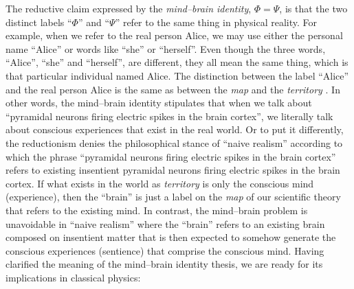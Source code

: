 \documentclass{ws-ijmpb}
\begin{document}
The reductive claim expressed by the \emph{mind--brain identity}, $\Phi=\Psi$,
is that the two distinct labels ``$\Phi$'' and ``$\Psi$''
refer to the same thing in physical reality. For example, when we
refer to the real person Alice, we may use either the personal name
``Alice'' or words like ``she'' or ``herself''.
Even though the three words, ``Alice'', ``she'' and
``herself'', are different, they all mean the same thing,
which is that particular individual named Alice. The distinction between
the label ``Alice'' and the real person Alice is the same
as between the \emph{map} and the \emph{territory} \cite{Korzybski1994}. In other
words, the mind--brain identity stipulates that when we talk about
``pyramidal neurons firing electric spikes in the brain cortex'',
we literally talk about conscious experiences that exist in the real
world. Or to put it differently, the reductionism denies the philosophical
stance of ``naive realism'' according to which the phrase ``pyramidal
neurons firing electric spikes in the brain cortex'' refers
to existing insentient pyramidal neurons firing electric spikes in the brain cortex.
If what exists in the world as \emph{territory} is only the conscious mind (experience), then
the ``brain'' is just a label on the \emph{map} of our scientific theory that refers to the existing mind.
In contrast, the mind--brain problem is unavoidable in ``naive realism'' where the ``brain'' refers to an existing
brain composed on insentient matter that is then expected to somehow generate
the conscious experiences (sentience) that comprise the conscious mind.
Having clarified the meaning of the mind--brain identity thesis, we
are ready for its implications in classical physics:
\end{document}
